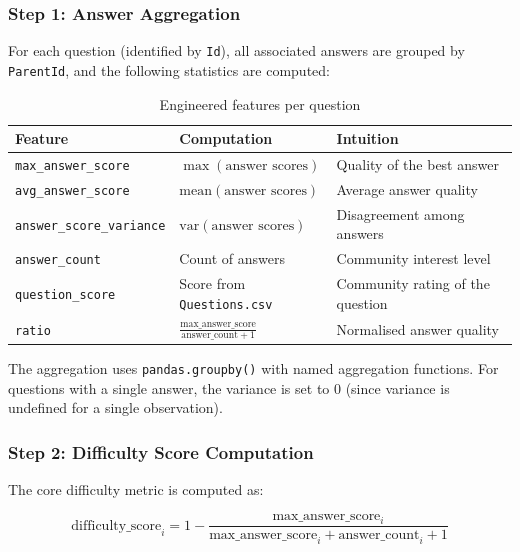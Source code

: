 \documentclass[12pt, a4paper]{article}
\begin{document}
\subsubsection{Step 1: Answer Aggregation}

For each question (identified by \texttt{Id}), all associated answers are grouped by \texttt{ParentId}, and the following statistics are computed:

\begin{table}[H]
\centering
\caption{Engineered features per question}
\label{tab:features}
\begin{tabular}{lll}
\toprule
\textbf{Feature} & \textbf{Computation} & \textbf{Intuition} \\
\midrule
\texttt{max\_answer\_score}   & $\max(\text{answer scores})$       & Quality of the best answer \\
\texttt{avg\_answer\_score}   & $\text{mean}(\text{answer scores})$  & Average answer quality \\
\texttt{answer\_score\_variance} & $\text{var}(\text{answer scores})$ & Disagreement among answers \\
\texttt{answer\_count}        & Count of answers               & Community interest level \\
\texttt{question\_score}      & Score from \texttt{Questions.csv}   & Community rating of the question \\
\texttt{ratio}                & $\frac{\text{max\_answer\_score}}{\text{answer\_count} + 1}$ & Normalised answer quality \\
\bottomrule
\end{tabular}
\end{table}

The aggregation uses \texttt{pandas.groupby()} with named aggregation functions. For questions with a single answer, the variance is set to 0 (since variance is undefined for a single observation).

\subsubsection{Step 2: Difficulty Score Computation}

The core difficulty metric is computed as:

\begin{equation}
    \text{difficulty\_score}_i = 1 - \frac{\text{max\_answer\_score}_i}{\text{max\_answer\_score}_i + \text{answer\_count}_i + 1}
    \label{eq:difficulty}
\end{equation}
\end{document}

